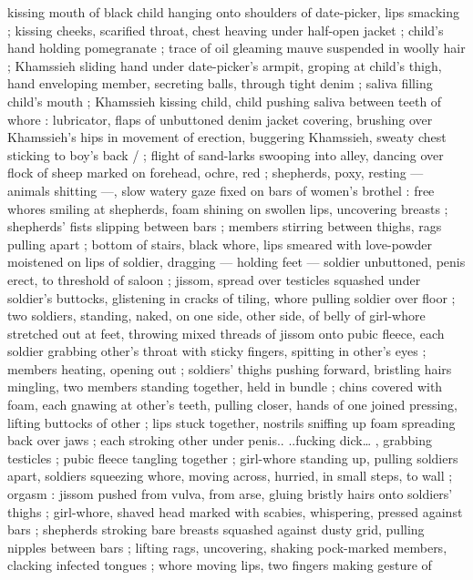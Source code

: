 \documentclass[10pt,twoside]{memoir}
\begin{document}
kissing mouth of black child hanging onto shoulders of date-picker, 
lips smacking ; kissing cheeks, scarified throat, chest heaving under 
half-open jacket ; child's hand holding pomegranate ; trace of oil 
gleaming mauve suspended in woolly hair ; Khamssieh sliding hand 
under date-picker's armpit, groping at child's thigh, hand enveloping 
member, secreting balls, through tight denim ; saliva filling child's 
mouth ; Khamssieh kissing child, child pushing saliva between teeth 
of whore : lubricator, flaps of unbuttoned denim jacket covering, 
brushing over Khamssieh's hips in movement of erection, buggering 
Khamssieh, sweaty chest sticking to boy's back / ; flight of 
sand-larks swooping into alley, dancing over flock of sheep marked on %
forehead, ochre, red ; shepherds, poxy, resting --- animals shitting 
---, slow watery gaze fixed on bars of women's brothel : free whores 
smiling at shepherds, foam shining on swollen lips, uncovering 
breasts ; shepherds' fists slipping between bars ; members stirring 
between thighs, rags pulling apart ; bottom of stairs, black whore, 
lips smeared with love-powder moistened on lips of soldier, dragging 
--- holding feet --- soldier unbuttoned, penis erect, to threshold of 
saloon ; jissom, spread over testicles squashed under soldier's 
buttocks, glistening in cracks of tiling, whore pulling soldier over 
floor ; two soldiers, standing, naked, on one side, other side, of belly
of girl-whore stretched out at feet, throwing mixed threads of jissom 
onto pubic fleece, each soldier grabbing other's throat with sticky 
fingers, spitting in other's eyes ; members heating, opening out ; 
soldiers' thighs pushing forward, bristling hairs mingling, two 
members standing together, held in bundle ; chins covered with 
foam, each gnawing at other's teeth, pulling closer, hands of one 
joined pressing, lifting buttocks of other ; lips stuck together, nostrils 
sniffing up foam spreading back over jaws ; each stroking other 
under penis.. {\gl} ..fucking dick\ldots {\gr} , grabbing testicles ; pubic fleece 
tangling together ; girl-whore standing up, pulling soldiers apart, 
soldiers squeezing whore, moving across, hurried, in small steps, to 
wall ; orgasm : jissom pushed from vulva, from arse, gluing bristly 
hairs onto soldiers' thighs ; girl-whore, shaved head marked with 
scabies, whispering, pressed against bars ; shepherds stroking bare 
breasts squashed against dusty grid, pulling nipples between bars ; 
lifting rags, uncovering, shaking pock-marked members, clacking 
infected tongues ; whore moving lips, two fingers making gesture of 
\end{document}
